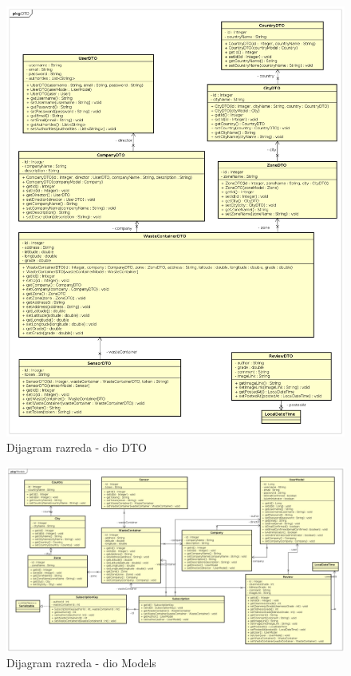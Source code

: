 			
			\begin{figure}[H]
				\includegraphics[width=1.0\linewidth]{slike/DTO.png}
				\centering
				\caption{Dijagram razreda - dio DTO}
				\label{fig:DTO}
			\end{figure}

			\begin{figure}[H]
				\includegraphics[width=1.0\linewidth]{slike/Models.png}
				\centering
				\caption{Dijagram razreda - dio Models}
				\label{fig:models}
			\end{figure}
		
